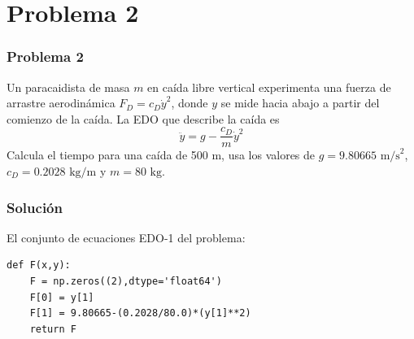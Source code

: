 \section{Problema 2}
\begin{frame}
\frametitle{Problema 2}
Un paracaidista de masa $m$ en caída libre vertical experimenta una fuerza de arrastre aerodinámica $F_{D} = c_{D} \dot{y}^{2}$, donde $y$ se mide hacia abajo a partir del comienzo de la caída. La EDO que describe la caída es
\[ \ddot{y} = g - \dfrac{c_{D}}{m} \dot{y}^{2}\]
Calcula el tiempo para una caída de 500 m, usa los valores de $g=9.80665 \mbox{ m/s}^{2}$, $c_{D}=0.2028 \mbox{ kg/m}$ y $m=80 \mbox{ kg}$.
\end{frame}
\begin{frame}[fragile]
\frametitle{Solución}
El conjunto de ecuaciones EDO-1 del problema:
\begin{lstlisting}
def F(x,y):
    F = np.zeros((2),dtype='float64')
    F[0] = y[1]
    F[1] = 9.80665-(0.2028/80.0)*(y[1]**2)
    return F
\end{lstlisting}
\end{frame}
